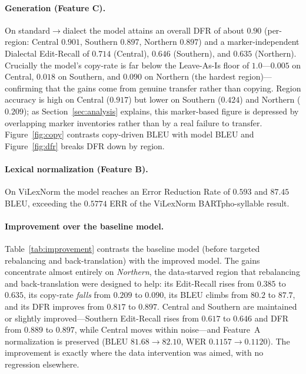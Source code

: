 \documentclass[11pt]{article}
\begin{document}
\paragraph{Generation (Feature C).}
On standard$\rightarrow$dialect the model attains an overall DFR of about $0.90$
(per-region: Central $0.901$, Southern $0.897$, Northern $0.897$) and a
marker-independent Dialectal Edit-Recall of $0.714$ (Central), $0.646$
(Southern), and $0.635$ (Northern). Crucially the model's copy-rate is far below
the Leave-As-Is floor of $1.0$---$0.005$ on Central, $0.018$ on Southern, and
$0.090$ on Northern (the hardest region)---confirming that the gains come from
genuine transfer rather than copying. Region accuracy is high on Central
($0.917$) but lower on Southern ($0.424$) and Northern ($0.209$); as
Section~\ref{sec:analysis} explains, this marker-based figure is depressed by
overlapping marker inventories rather than by a real failure to transfer.
Figure~\ref{fig:copy} contrasts copy-driven BLEU with model BLEU and
Figure~\ref{fig:dfr} breaks DFR down by region.

\paragraph{Lexical normalization (Feature B).}
On ViLexNorm the model reaches an Error Reduction Rate of $0.593$ and $87.45$
BLEU, exceeding the $0.5774$ ERR of the ViLexNorm BARTpho-syllable result.

\paragraph{Improvement over the baseline model.}
Table~\ref{tab:improvement} contrasts the baseline model (before targeted
rebalancing and back-translation) with the improved model. The gains concentrate
almost entirely on \emph{Northern}, the data-starved region that rebalancing and
back-translation were designed to help: its Edit-Recall rises from $0.385$ to
$0.635$, its copy-rate \emph{falls} from $0.209$ to $0.090$, its BLEU climbs from
$80.2$ to $87.7$, and its DFR improves from $0.817$ to $0.897$. Central and
Southern are maintained or slightly improved---Southern Edit-Recall rises from
$0.617$ to $0.646$ and DFR from $0.889$ to $0.897$, while Central moves within
noise---and Feature~A normalization is preserved (BLEU $81.68\!\rightarrow\!82.10$,
WER $0.1157\!\rightarrow\!0.1120$). The improvement is exactly where the data
intervention was aimed, with no regression elsewhere.
\end{document}
